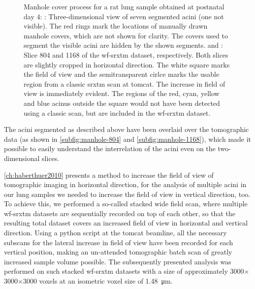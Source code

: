 \begin{figure}[htb]
{{%
			\label{subfig:manhole-1168}%
		}%
	}%
	\caption[Manhole cover process]{Manhole cover process for a rat lung sample obtained at postnatal day 4: : Three-dimensional view of seven segmented acini (one not visible). The red rings mark the locations of manually drawn manhole covers, which are not shown for clarity. The covers used to segment the visible acini are hidden by the shown segments.  and : Slice 804 and 1168 of the \ac{wf-srxtm} dataset, respectively. Both slices are slightly cropped in horizontal direction. The white square marks the field of view and the semitransparent cirlce marks the usable region from a classic \ac{srxtm} scan at \ac{tomcat}. The increase in field of view is immediately evident. The regions of the red, cyan, yellow and blue acinus outside the square would not have been detected using a classic scan, but are included in the \ac{wf-srxtm} dataset.}
	\label{fig:manhole cover}%
\end{figure}%

The acini segmented as described above have been overlaid over the tomographic data (as shown in \autoref{subfig:manhole-804} and \ref{subfig:manhole-1168}), which made it possible to easily understand the interrelation of the acini even on the two-dimensional slices. 

\autoref{ch:haberthuer2010} presents a method to increase the field of view of tomographic imaging in horizontal direction, for the analysis of multiple acini in our lung samples we needed to increase the field of view in vertical direction, too. To achieve this, we performed a so-called stacked wide field scan, where multiple \ac{wf-srxtm} datasets are sequentially recorded on top of each other, so that the resulting total dataset covers an increased field of view in horizontal and vertical direction. Using a python script at the \ac{tomcat} beamline, all the necessary subscans for the lateral increase in field of view have been recorded for each vertical position, making an un-attended tomographic batch scan of greatly increased sample volume possible. The subsequently presented analysis was performed on such stacked \ac{wf-srxtm} datasets with a size of approximately 3000$\times$3000$\times$3000 voxels at an isometric voxel size of \SI{1.48}{\micro\meter}.

